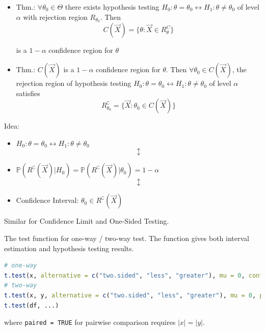 \begin{itemize}
    \item Thm.: $\forall\theta_0\in\Theta$ there exists hypothesis testing $H_0:\theta=\theta_0\longleftrightarrow H_1:\theta\neq\theta_0$ of level $\alpha$ with rejection region $R_{\theta_0}$. Then
    \begin{equation}
        C(\vec{X})=\{\theta:\vec{X}\in R^C_{\theta}\}
    \end{equation}

    is a $1-\alpha$ confidence region for $\theta$

    \item Thm.: $C(\vec{X})$ is a $1-\alpha$ confidence region for $\theta$. Then $\forall\theta_0\in C(\vec{X})$, the rejection region of hypothesis testing $H_0:\theta=\theta_0\longleftrightarrow H_1:\theta\neq\theta_0$ of level $\alpha$ satisfies
    \begin{equation}
    R^\complement_{\theta_0}=\{\vec{X}:\theta_0\in C(\vec{X})\}
    \end{equation}
\end{itemize}
    
    \begin{point}
        Idea:
    \end{point}
    
        
\begin{itemize}[itemsep=-3pt]
    \item[] \centering $H_0:\theta=\theta_0\longleftrightarrow H_1:\theta\neq\theta_0$
    \begin{equation*}\updownarrow\end{equation*}
    \item[] \centering $\mathbb{P}(R^\complement(\vec{X})|H_0)=\mathbb{P}(R^\complement(\vec{X})|\theta_0)=1-\alpha$
    \begin{equation*}\updownarrow\end{equation*}
    \item[] Confidence Interval: $\theta_0\in R^\complement(\vec{X})$
\end{itemize}

    Similar for Confidence Limit and One-Sided Testing.

\hypertarget{CODEttest}{}
\begin{rcode}
The test function for one-way / two-way test. The function gives both interval estimation and hypothesis testing results.
\begin{lstlisting}[language=R]
# one-way
t.test(x, alternative = c("two.sided", "less", "greater"), mu = 0, conf.level = 0.95, ...)
# two-way
t.test(x, y, alternative = c("two.sided", "less", "greater"), mu = 0, paired = FALSE, var.equal = FALSE, conf.level = 0.95, ...)
t.test(df, ...) 
\end{lstlisting}
where \lstinline|paired = TRUE| for pairwise comparison requires $ |x|=|y| $.
\end{rcode}


